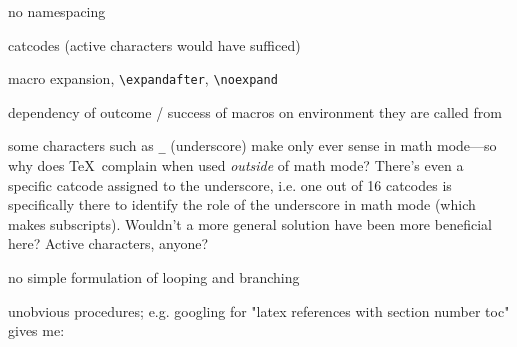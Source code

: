 no namespacing

catcodes (active characters would have sufficed)

macro expansion,
\verb#\expandafter#, \verb#\noexpand#

dependency of outcome / success of macros on environment they are called from

some characters such as \verb#_# (underscore) make only ever sense in math mode---so why does \TeX\ complain when used
{\em outside} of math mode? There's even a specific catcode assigned to the underscore, i.e. one out of
16 catcodes is specifically there to identify the role of the underscore in math mode (which makes subscripts).
Wouldn't a more general solution have been more beneficial here? Active characters, anyone?

no simple formulation of looping and branching

unobvious procedures; e.g. googling for "latex references with section number toc" gives me:










